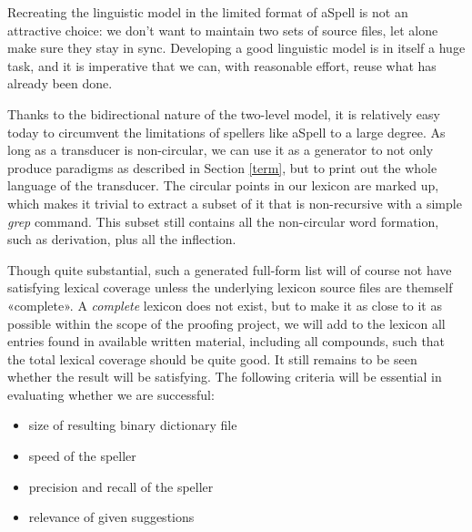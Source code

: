 \documentclass[a4paper,english]{article}
\begin{document}
Recreating the linguistic model in the limited format of aSpell is not an attractive choice: we don't want to maintain two sets of source files, let alone make sure they stay in sync. Developing a good linguistic model is in itself a huge task, and it is imperative that we can, with reasonable effort, reuse what has already been done.

Thanks to the bidirectional nature of the two-level model, it is relatively easy today to circumvent the limitations of spellers like aSpell to a large degree. As long as a transducer  is non-circular, we can use it as a generator to not only produce paradigms as described in Section \ref{term}, but to print out the whole language of the transducer. The circular points in our lexicon are marked up, which makes it trivial to extract a subset of it that is non-recursive with a simple \textit{grep} command. This subset still contains all the non-circular word formation, such as derivation, plus all the inflection.%



Though quite substantial, such a generated full-form list will of course not have satisfying lexical coverage unless the underlying lexicon source files are themself «complete». A \textit{complete} lexicon does not exist, but to make it as close to it as possible within the scope of the proofing project, we will add to the lexicon all entries found in available written material, including all compounds, such that the total lexical coverage should be quite good. It still remains to be seen whether the result will be satisfying. The following criteria will be essential in evaluating whether we are successful:

\begin{itemize}
\item size of resulting binary dictionary file
\item speed of the speller
\item precision and recall of the speller
\item relevance of given suggestions
\end{itemize}
\end{document}
